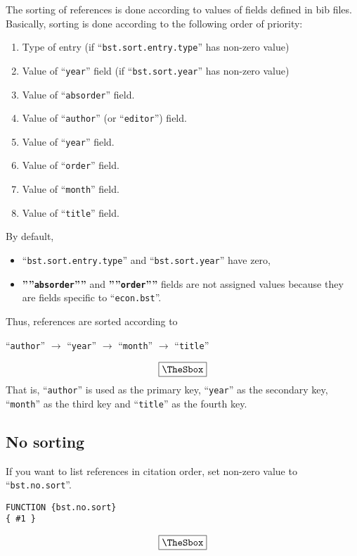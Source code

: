 \documentclass[10pt]{article}
\newenvironment{Frame}%
{\setlength{\fboxsep}{15pt}
\setlength{\mylength}{\linewidth}%
\addtolength{\mylength}{-2\fboxsep}%
\addtolength{\mylength}{-2\fboxrule}%
\Sbox
\minipage{\mylength}%
\setlength{\abovedisplayskip}{0pt}%
\setlength{\belowdisplayskip}{0pt}%
}%
{\endminipage\endSbox
\[\fbox{\TheSbox}\]}
\begin{document}
The sorting of references is done according to values of fields defined
in bib files.  Basically, sorting is done according to the following
order of priority:
\begin{enumerate}
 \item Type of entry (if ``\texttt{bst.sort.entry.type}'' has non-zero value)
 \item Value of ``\texttt{year}'' field (if ``\texttt{bst.sort.year}'' has non-zero value)
 \item Value of ``\texttt{absorder}'' field.
 \item Value of ``\texttt{author}'' (or ``\texttt{editor}'') field.
 \item Value of ``\texttt{year}'' field.
 \item Value of ``\texttt{order}'' field.
 \item Value of ``\texttt{month}'' field.
 \item Value of ``\texttt{title}'' field.
\end{enumerate}

By default, 
\begin{itemize}
 \item ``\texttt{bst.sort.entry.type}'' and ``\texttt{bst.sort.year}'' have
       zero,
 \item \textbf{''''\texttt{absorder}''''} and \textbf{''''\texttt{order}''''}
       fields are not assigned values because they are fields specific
       to ``\texttt{econ.bst}''.
\end{itemize}
Thus, references are sorted according to
\begin{Frame}
 \begin{center}
 ``\texttt{author}'' $\rightarrow$ ``\texttt{year}'' $\rightarrow$
 ``\texttt{month}'' $\rightarrow$  ``\texttt{title}'' 
\end{center}
\end{Frame}
That is, ``\texttt{author}'' is used as the primary key, ``\texttt{year}'' as
the secondary key, ``\texttt{month}'' as the third key and ``\texttt{title}'' as
the fourth key.

\subsection{No sorting}

If you want to list references in citation order, set non-zero value to
``\texttt{bst.no.sort}''.
\begin{Frame}
\begin{verbatim}
FUNCTION {bst.no.sort}
{ #1 }
\end{verbatim}
\end{Frame}
\end{document}
